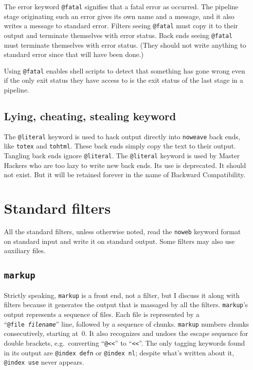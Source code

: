 \documentclass{article}
\makeatletter
\newcommand\kw[1]{\texttt{@#1}}
\newcommand\ikw[1]{\kw{index~#1}}
\makeatother
\begin{document}
The error keyword \kw{fatal} signifies that a fatal error as
occurred.
The pipeline stage originating such an error gives its own name and a
message, and it also writes a message to standard error.
Filters seeing \kw{fatal} must copy it to their output and terminate
themselves with error status.
Back ends seeing \kw{fatal} must terminate themselves with error
status. (They should not write anything to standard error since that
will have been done.)

Using \kw{fatal} enables shell scripts to detect
that something has gone wrong even if the only exit status they have
access to is the
exit status of the last stage in a pipeline.

\subsection{Lying, cheating, stealing keyword}

The \kw{literal} keyword is used to hack output directly into \texttt{noweave}
back ends, like \texttt{totex} and \texttt{tohtml}.
These back ends simply copy the text to their output.
Tangling back ends ignore \kw{literal}.
The \kw{literal} keyword is used by Master Hackers who are too lazy to
write new back ends.
Its use is deprecated.
It should not exist.
But it will be retained forever in the name of Backward Compatibility.




\section{Standard filters}

All the standard filters, unless otherwise noted, read the {\tt noweb}
keyword format on standard input and write it on standard output.
Some filters may also use auxiliary files.

\subsection{\tt markup}

Strictly speaking, {\tt markup} is a front end, not a filter, but I
discuss it along with filters because it generates the output that is
massaged by all the filters.
{\tt markup}'s output represents a sequence of files.
Each file is represented by a ``{\tt @file~{\rm\it filename}}'' line,
followed by a sequence of chunks.
{\tt markup} numbers chunks consecutively, starting at~0.
It also recognizes and undoes the escape sequence for double brackets,
e.g.~converting ``{\tt @<<}'' to ``{\tt <<}''.
The only tagging keywords found in its output are \ikw{defn} or
\ikw{nl}; despite what's written about it, \ikw{use} never appears.
\end{document}
